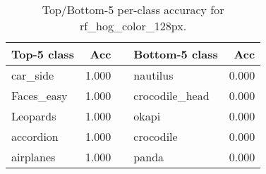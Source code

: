 \begin{table}[h]
  \centering
  \begin{tabular}{l r c l r}
    \toprule
    \textbf{Top-5 class} & \textbf{Acc} & & \textbf{Bottom-5 class} & \textbf{Acc}\\
    \midrule
    car_side & 1.000 & & nautilus & 0.000\\
    Faces_easy & 1.000 & & crocodile_head & 0.000\\
    Leopards & 1.000 & & okapi & 0.000\\
    accordion & 1.000 & & crocodile & 0.000\\
    airplanes & 1.000 & & panda & 0.000\\
    \bottomrule
  \end{tabular}
  \caption{Top/Bottom-5 per-class accuracy for rf_hog_color_128px.}
  \label{tab:perclass_rf_hog_color_128px}
\end{table}